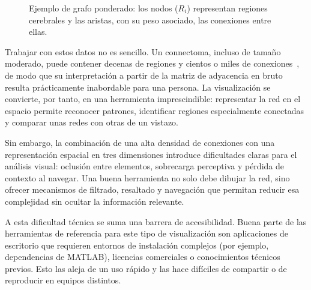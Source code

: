 \begin{figure}[H]
	\centering
	\caption[Ejemplo de grafo ponderado.]{Ejemplo de grafo ponderado: los nodos ($R_i$) representan regiones cerebrales y las
	aristas, con su peso asociado, las conexiones entre ellas.}
	\label{fig:grafo-ponderado}
\end{figure}

Trabajar con estos datos no es sencillo. Un connectoma, incluso de tamaño moderado, puede contener
decenas de regiones y cientos o miles de conexiones~\cite{bullmore2009}, de modo que su
interpretación a partir de la matriz de adyacencia en bruto resulta prácticamente inabordable para
una persona. La visualización
se convierte, por tanto, en una herramienta imprescindible: representar la red en el espacio permite
reconocer patrones, identificar regiones especialmente conectadas y comparar unas redes con otras de
un vistazo.

Sin embargo, la combinación de una alta densidad de conexiones con una representación espacial en
tres dimensiones introduce dificultades claras para el análisis visual: oclusión entre elementos,
sobrecarga perceptiva y pérdida de contexto al navegar. Una buena herramienta no solo debe dibujar
la red, sino ofrecer mecanismos de filtrado, resaltado y navegación que permitan reducir esa
complejidad sin ocultar la información relevante.

A esta dificultad técnica se suma una barrera de accesibilidad. Buena parte de las herramientas de
referencia para este tipo de visualización son aplicaciones de escritorio que requieren entornos de
instalación complejos (por ejemplo, dependencias de MATLAB), licencias comerciales o conocimientos
técnicos previos. Esto las aleja de un uso rápido y las hace difíciles de compartir o de reproducir
en equipos distintos.

